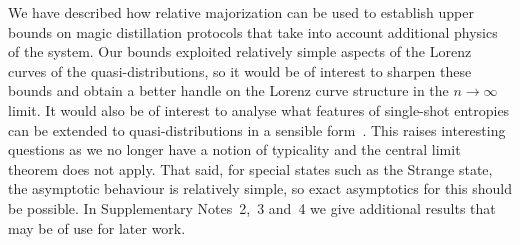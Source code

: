 \documentclass[
onecolumn,
superscriptaddress
]{revtex4-1}
\begin{document}
We have described how relative majorization can be used to establish upper bounds on magic distillation protocols that take into account additional physics of the system. Our bounds exploited relatively simple aspects of the Lorenz curves of the quasi-distributions, so it would be of interest to sharpen these bounds and obtain a better handle on the Lorenz curve structure in the $n\rightarrow \infty$ limit. It would also be of interest to analyse what features of single-shot entropies can be extended to quasi-distributions in a sensible form~\cite{renner_phd, tomamichel2013}. This raises interesting questions as we no longer have a notion of typicality and the central limit theorem does not apply. That said, for special states such as the Strange state, the asymptotic behaviour is relatively simple, so exact asymptotics for this should be possible. In Supplementary Notes~2,~3 and~4 we give additional results that may be of use for later work.
\end{document}
